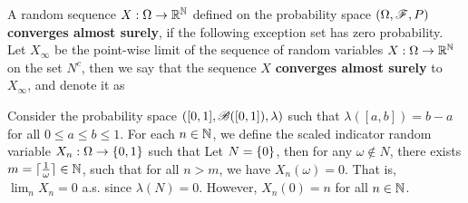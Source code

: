 \documentclass[letterpaper,10pt,english]{article}
\begin{document}
\begin{defn}
A random sequence $X:\Omega\to\mathbb{R}^{\mathbb{N}}$ defined on the probability space $(\Omega, \mathscr{F}, P)$ \textbf{converges almost surely}, 
if the following exception set 
has zero probability. 
Let $X_\infty$ be the point-wise limit of the sequence of random variables $X:\Omega\to\mathbb{R}^{\mathbb{N}}$ on the set $N^c$, 
then we say that the sequence $X$ \textbf{converges almost surely} to $X_\infty$, and denote it as 
\end{defn}
\begin{shaded}
\begin{exmp} 
Consider the probability space $([0,1], \mathscr{B}([0,1]), \lambda)$ such that $\lambda([a,b]) = b-a$ for all $0 \le a \le b \le 1$. 
For each $n \in \mathbb{N}$, we define the scaled indicator random variable $X_n: \Omega \to \left\{0,1\right\}$ such that
Let $N = \left\{0\right\}$, then for any $\omega \notin N$, there exists $m = \lceil\frac{1}{\omega}\rceil \in \mathbb{N}$, such that for all $n > m$, we have $X_n(\omega) = 0$. 
That is, $\lim_nX_n = 0$ a.s. since $\lambda(N) = 0$. 
However, $X_n(0) = n$ for all $n \in \mathbb{N}$. 
\end{exmp}
\end{shaded}
\end{document}
